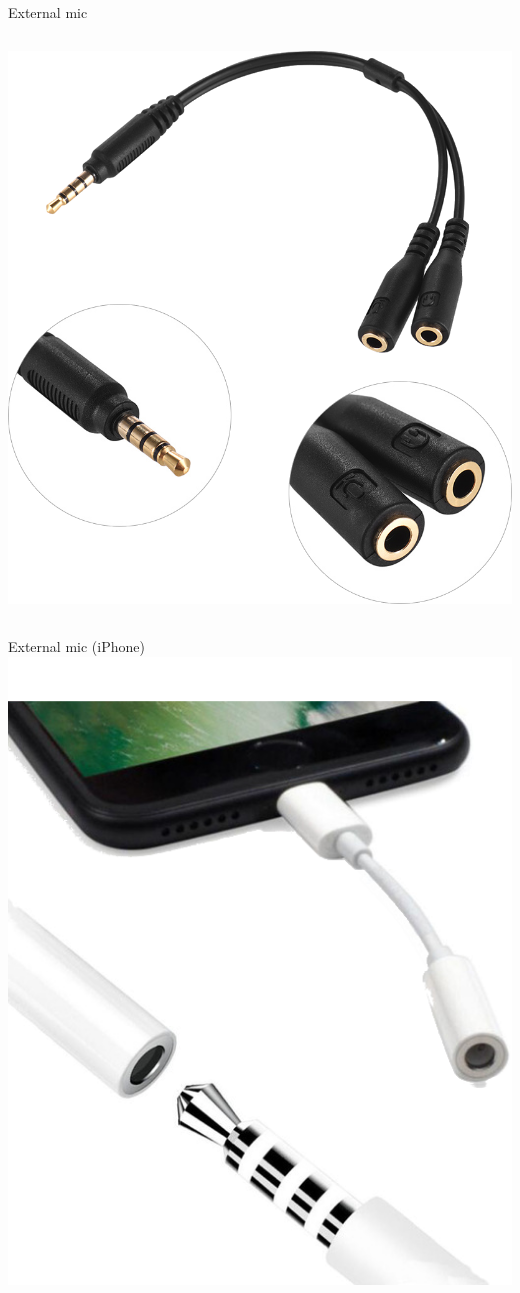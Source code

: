 \documentclass[serif,14pt,color=usenames,dvipsnames]{beamer}
\begin{document}
\begin{frame}{External mic}
\begin{columns}
    \includegraphics[width=\linewidth]{imgs/trrs}
\end{columns}
\end{frame}

\begin{frame}{External mic (iPhone)}
  \centering
  \includegraphics[width=0.4\linewidth]{imgs/35mm}
\end{frame}
\end{document}
